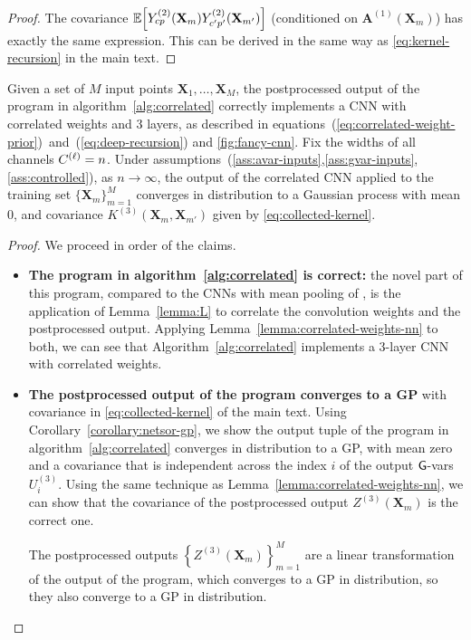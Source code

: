 \documentclass[tablecaption=bottom,wcp,nonatbib]{jmlr} %
\newcommand{\vX}{\mathbf{X}}
\newcommand{\vA}{\mathbf{A}}
\newcommand{\bracket}[3]{{\left#1 #3 \right#2}}
\newcommand{\cb}{\bracket{\{}{\}}}
\newcommand{\sqb}{\bracket{[}{]}}
\begin{document}
{{\begin{proof}
  The covariance $\ExpSymb\sqb{Y_{cp}^{(2)}(\vX_m)Y_{c' p'}^{(2)}(\vX_{m'})}$
  (conditioned on $\vA^{(1)}(\vX_m)$)
  has exactly the same expression. This can be derived in the same way as
  \cref{eq:kernel-recursion} in the main text.
\end{proof}


\begin{theorem}
  Given a set of $M$ input points $\vX_1,\dots,\vX_M$,
  the postprocessed output of the \Netsor program in algorithm~\ref{alg:correlated} correctly implements a
  CNN with correlated weights and 3 layers, as described in
  equations~(\ref{eq:correlated-weight-prior})~and~(\ref{eq:deep-recursion}) and \cref{fig:fancy-cnn}. Fix the widths of all channels
  $C^{(\ell)} = n$.
  Under assumptions~(\ref{ass:avar-inputs},\ref{ass:gvar-inputs},\ref{ass:controlled}),
  as $n \to \infty$, the output of the correlated CNN
  applied to the training set $\{\vX_m\}_{m=1}^M$ converges in distribution to a
  Gaussian process with mean 0, and covariance $K^{(3)}(\vX_{m}, \vX_{m'})$
  given by \cref{eq:collected-kernel}.
\label{theorem:correlated-weights-nn}
\end{theorem}
\begin{proof}
We proceed in order of the claims.
\begin{itemize}
  \item\textbf{The program in algorithm~\ref{alg:correlated} is correct:}
  the novel part of this program, compared to the CNNs with mean pooling of
  \citet[appendix~B.2]{yang2019wide}, is the application of Lemma~\ref{lemma:L}
  to correlate the convolution weights and the postprocessed output. Applying
  Lemma~\ref{lemma:correlated-weights-nn} to both, we can see that
  Algorithm~\ref{alg:correlated} implements a 3-layer CNN with correlated weights.

  \item\textbf{The postprocessed output of the program converges to a GP} with
      covariance in \cref{eq:collected-kernel} of the main text. Using
      Corollary~\ref{corollary:netsor-gp}, we show the output tuple of the
      \Netsor program in algorithm~\ref{alg:correlated} converges in
      distribution to a GP, with mean zero and a covariance that is independent across the
      index $i$ of the output $\mathsf{G}$-vars $U_i^{(3)}$. Using the same technique
      as Lemma~\ref{lemma:correlated-weights-nn}, we can show that the
      covariance of the postprocessed output $Z^{(3)}(\vX_m)$ is the correct one. 

      The postprocessed outputs $\cb{Z^{(3)}(\vX_m)}_{m=1}^M$ are a linear transformation of the output of the \Netsor program, which
      converges to a GP in distribution, so they also converge to a GP in distribution.
\end{itemize}
\end{proof}

} %
}%
\end{document}

